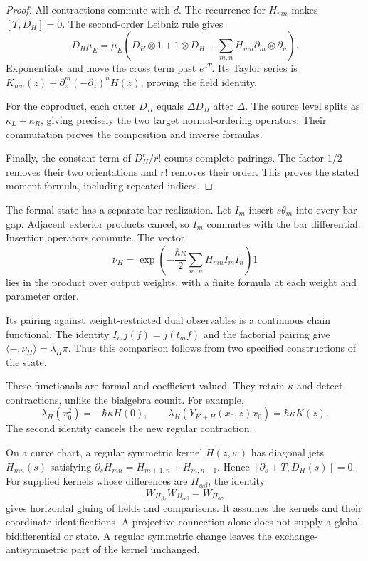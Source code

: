 \begin{proof}
All contractions commute with $d$.
The recurrence for $H_{mn}$ makes $[T,D_H]=0$.
The second-order Leibniz rule gives
\[
 D_H\mu_E=\mu_E\left(D_H\otimes1+1\otimes D_H+
             \sum_{m,n}H_{mn}\partial_m\otimes\partial_n\right).
\]
Exponentiate and move the cross term past $e^{zT}$.
Its Taylor series is $K_{mn}(z)+
\partial_z^m(-\partial_z)^nH(z)$, proving the field identity.

For the coproduct, each outer $D_H$ equals
$\Delta D_H$ after $\Delta$. The source level splits as
$\kappa_L+\kappa_R$, giving precisely the two target
normal-ordering operators. Their commutation proves
the composition and inverse formulas.

Finally, the constant term of $D_H^r/r!$ counts complete
pairings. The factor $1/2$ removes their two orientations
and $r!$ removes their order. This proves the stated
moment formula, including repeated indices.
\end{proof}

The formal state has a separate bar realization.
Let $I_m$ insert $s\theta_m$ into every bar gap.
Adjacent exterior products cancel, so $I_m$ commutes
with the bar differential. Insertion operators commute.
The vector
\[
 \nu_H=\exp\left(-\frac{\hbar\kappa}{2}
             \sum_{m,n}H_{mn}I_mI_n\right)1
\]
lies in the product over output weights, with a finite
formula at each weight and parameter order.

Its pairing against weight-restricted dual observables
is a continuous chain functional.
The identity $I_mj(f)=j(t_mf)$ and the factorial pairing
give $\langle-,\nu_H\rangle=\lambda_H\pi$.
Thus this comparison follows from two specified constructions
of the state.

These functionals are formal and coefficient-valued.
They retain $\kappa$ and detect contractions, unlike the
bialgebra counit. For example,
\[
 \lambda_H(x_0^2)=-\hbar\kappa H(0),\qquad
 \lambda_H(Y_{K+H}(x_0,z)x_0)=\hbar\kappa K(z).
\]
The second identity cancels the new regular contraction.

On a curve chart, a regular symmetric kernel $H(z,w)$
has diagonal jets $H_{mn}(s)$ satisfying
$\partial_sH_{mn}=H_{m+1,n}+H_{m,n+1}$.
Hence $[\partial_s+T,D_H(s)]=0$.
For supplied kernels whose differences are
$H_{\alpha\beta}$, the identity
\[
 W_{H_{\beta\gamma}}W_{H_{\alpha\beta}}
 =W_{H_{\alpha\gamma}}
\]
gives horizontal gluing of fields and comparisons.
It assumes the kernels and their coordinate identifications.
A projective connection alone does not supply a global
bidifferential or state. A regular symmetric change leaves
the exchange-antisymmetric part of the kernel unchanged.

